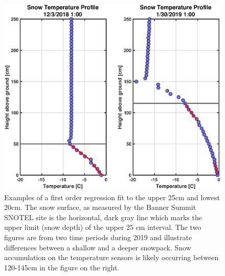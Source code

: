 \begin{figure}[H]
    \centering
    \includegraphics[width=1\linewidth]{figures/TempGrad/TempGrad_Ex.eps}
    \caption{Examples of a first order regression fit to the upper 25cm and lowest 20cm. The snow surface, as measured by the Banner Summit SNOTEL site is the horizontal, dark gray line which marks the upper limit (snow depth) of the upper 25 cm interval. The two figures are from two time periods during 2019 and illustrate differences between a shallow and a deeper snowpack. Snow accumulation on the temperature sensors is likely occurring between 120-145cm in the figure on the right.}
    \label{fig:TempGrad_Ex}
\end{figure}


 
 